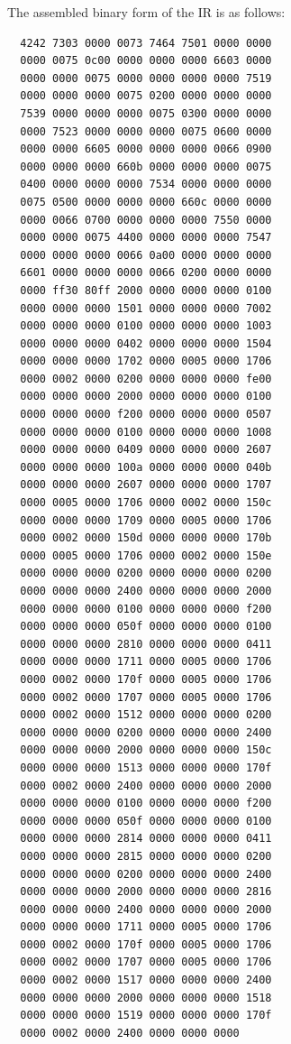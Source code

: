 \documentclass{report}
\begin{document}
The assembled binary form of the IR is as follows:

\begin{mdframed}[style=example]
\begin{verbatim}
  4242 7303 0000 0073 7464 7501 0000 0000
  0000 0075 0c00 0000 0000 0000 6603 0000
  0000 0000 0075 0000 0000 0000 0000 7519
  0000 0000 0000 0075 0200 0000 0000 0000
  7539 0000 0000 0000 0075 0300 0000 0000
  0000 7523 0000 0000 0000 0075 0600 0000
  0000 0000 6605 0000 0000 0000 0066 0900
  0000 0000 0000 660b 0000 0000 0000 0075
  0400 0000 0000 0000 7534 0000 0000 0000
  0075 0500 0000 0000 0000 660c 0000 0000
  0000 0066 0700 0000 0000 0000 7550 0000
  0000 0000 0075 4400 0000 0000 0000 7547
  0000 0000 0000 0066 0a00 0000 0000 0000
  6601 0000 0000 0000 0066 0200 0000 0000
  0000 ff30 80ff 2000 0000 0000 0000 0100
  0000 0000 0000 1501 0000 0000 0000 7002
  0000 0000 0000 0100 0000 0000 0000 1003
  0000 0000 0000 0402 0000 0000 0000 1504
  0000 0000 0000 1702 0000 0005 0000 1706
  0000 0002 0000 0200 0000 0000 0000 fe00
  0000 0000 0000 2000 0000 0000 0000 0100
  0000 0000 0000 f200 0000 0000 0000 0507
  0000 0000 0000 0100 0000 0000 0000 1008
  0000 0000 0000 0409 0000 0000 0000 2607
  0000 0000 0000 100a 0000 0000 0000 040b
  0000 0000 0000 2607 0000 0000 0000 1707
  0000 0005 0000 1706 0000 0002 0000 150c
  0000 0000 0000 1709 0000 0005 0000 1706
  0000 0002 0000 150d 0000 0000 0000 170b
  0000 0005 0000 1706 0000 0002 0000 150e
  0000 0000 0000 0200 0000 0000 0000 0200
  0000 0000 0000 2400 0000 0000 0000 2000
  0000 0000 0000 0100 0000 0000 0000 f200
  0000 0000 0000 050f 0000 0000 0000 0100
  0000 0000 0000 2810 0000 0000 0000 0411
  0000 0000 0000 1711 0000 0005 0000 1706
  0000 0002 0000 170f 0000 0005 0000 1706
  0000 0002 0000 1707 0000 0005 0000 1706
  0000 0002 0000 1512 0000 0000 0000 0200
  0000 0000 0000 0200 0000 0000 0000 2400
  0000 0000 0000 2000 0000 0000 0000 150c
  0000 0000 0000 1513 0000 0000 0000 170f
  0000 0002 0000 2400 0000 0000 0000 2000
  0000 0000 0000 0100 0000 0000 0000 f200
  0000 0000 0000 050f 0000 0000 0000 0100
  0000 0000 0000 2814 0000 0000 0000 0411
  0000 0000 0000 2815 0000 0000 0000 0200
  0000 0000 0000 0200 0000 0000 0000 2400
  0000 0000 0000 2000 0000 0000 0000 2816
  0000 0000 0000 2400 0000 0000 0000 2000
  0000 0000 0000 1711 0000 0005 0000 1706
  0000 0002 0000 170f 0000 0005 0000 1706
  0000 0002 0000 1707 0000 0005 0000 1706
  0000 0002 0000 1517 0000 0000 0000 2400
  0000 0000 0000 2000 0000 0000 0000 1518
  0000 0000 0000 1519 0000 0000 0000 170f
  0000 0002 0000 2400 0000 0000 0000
\end{verbatim}
\end{mdframed}
\end{document}
